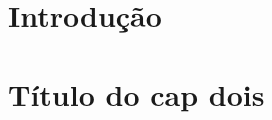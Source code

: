 \documentclass[12pt]{report}
\begin{document}











\tableofcontents
\listoffigures
{}
\listoftables
{}




\chapter{Introdução}

%
\chapter{Título do cap dois}

%
% 
%
% 
%
% 
%
% 


%
  
\end{document}
